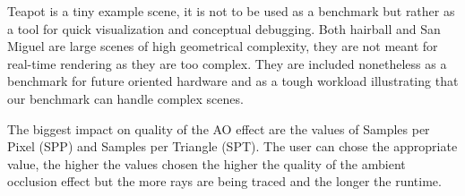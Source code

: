 Teapot is a tiny example scene, it is not to be used as a benchmark but rather as a tool for quick visualization and conceptual debugging. Both hairball and San Miguel are large scenes of high geometrical complexity, they are not meant for real-time rendering as they are too complex. They are included nonetheless as a benchmark for future oriented hardware and as a tough workload illustrating that our benchmark can handle complex scenes. 


The biggest impact on quality of the AO effect are the values of Samples per Pixel (SPP) and Samples per Triangle (SPT). The user can chose the appropriate value, the higher the values chosen the higher the quality of the ambient occlusion effect but the more rays are being traced and the longer the runtime. 


